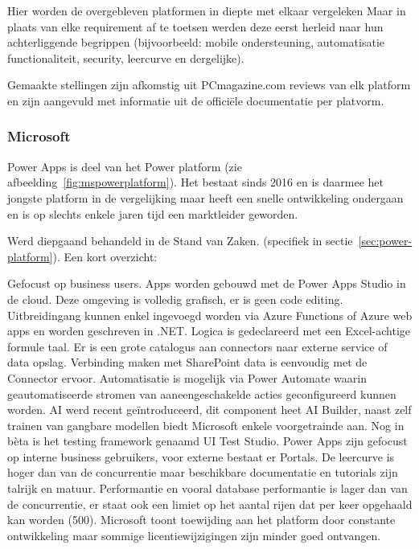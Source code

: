 
Hier worden de overgebleven platformen in diepte met elkaar vergeleken Maar in plaats van elke requirement af te toetsen werden deze eerst herleid naar hun achterliggende begrippen (bijvoorbeeld: mobile ondersteuning, automatisatie functionaliteit, security, leercurve en dergelijke).

Gemaakte stellingen zijn afkomstig uit PCmagazine.com reviews van elk platform en zijn aangevuld met informatie uit de officiële documentatie per platvorm.

\subsubsection{Microsoft}

Power Apps is deel van het Power platform (zie afbeelding~\ref{fig:mspowerplatform}). Het bestaat sinds 2016 en is daarmee het jongste platform in de vergelijking maar heeft een snelle ontwikkeling ondergaan en is op slechts enkele jaren tijd een marktleider geworden.

Werd diepgaand behandeld in de Stand van Zaken. (specifiek in sectie~\ref{sec:power-platform}). Een kort overzicht:

Gefocust op business users.
Apps worden gebouwd met de Power Apps Studio in de cloud. Deze omgeving is volledig grafisch, er is geen code editing. Uitbreidingang kunnen enkel ingevoegd worden via Azure Functions of Azure web apps en worden geschreven in .NET. Logica is gedeclareerd met een Excel-achtige formule taal. Er is een grote catalogus aan connectors naar externe service of data opslag. Verbinding maken met SharePoint data is eenvoudig met de Connector ervoor. Automatisatie is mogelijk via Power Automate waarin geautomatiseerde stromen van aaneengeschakelde acties geconfigureerd kunnen worden. AI werd recent geïntroduceerd, dit component heet AI Builder, naast zelf trainen van gangbare modellen biedt Microsoft enkele voorgetrainde aan. Nog in bèta is het testing framework genaamd UI Test Studio. Power Apps zijn gefocust op interne business gebruikers, voor externe bestaat er Portals. De leercurve is hoger dan van de concurrentie maar beschikbare documentatie en tutorials zijn talrijk en matuur. Performantie en vooral database performantie is lager dan van de concurrentie, er staat ook een limiet op het aantal rijen dat per keer opgehaald kan worden (500). Microsoft toont toewijding aan het platform door constante ontwikkeling maar sommige licentiewijzigingen zijn minder goed ontvangen.

